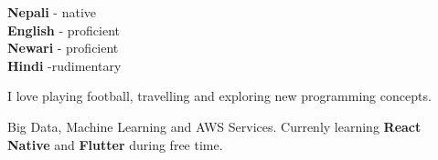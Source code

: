 \documentclass[9pt]{developercv} %
\begin{document}
\begin{minipage}[t]{0.3\textwidth}
	\vspace{-\baselineskip} %

	
	\textbf{Nepali} - native\\
	\textbf{English} - proficient\\
	\textbf{Newari} - proficient\\
	\textbf{Hindi} -rudimentary
\end{minipage}
\hfill
\begin{minipage}[t]{0.3\textwidth}
	\vspace{-\baselineskip} %
	
	
	I love playing football, travelling and exploring new programming concepts.
\end{minipage}
\hfill
\begin{minipage}[t]{0.3\textwidth}
	\vspace{-\baselineskip} %
	
	
	Big Data, Machine Learning and AWS Services. Currenly learning \textbf{React Native} and \textbf{Flutter} during free time.
\end{minipage}

\end{document}

